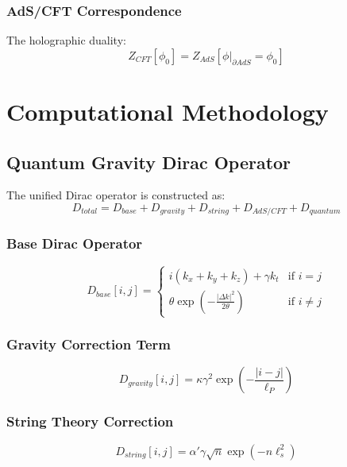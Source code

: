 \documentclass[12pt]{article}
\begin{document}
\subsubsection{AdS/CFT Correspondence}
The holographic duality:
\begin{equation}
Z_{CFT}[\phi_0] = Z_{AdS}[\phi|_{\partial AdS} = \phi_0]
\end{equation}

\section{Computational Methodology}

\subsection{Quantum Gravity Dirac Operator}

The unified Dirac operator is constructed as:
\begin{equation}
D_{total} = D_{base} + D_{gravity} + D_{string} + D_{AdS/CFT} + D_{quantum}
\end{equation}

\subsubsection{Base Dirac Operator}
\begin{equation}
D_{base}[i,j] = \begin{cases}
i(k_x + k_y + k_z) + \gamma k_t & \text{if } i = j \\
\theta \exp\left(-\frac{|\Delta k|^2}{2\theta}\right) & \text{if } i \neq j
\end{cases}
\end{equation}

\subsubsection{Gravity Correction Term}
\begin{equation}
D_{gravity}[i,j] = \kappa \gamma^2 \exp\left(-\frac{|i-j|}{\ell_P}\right)
\end{equation}

\subsubsection{String Theory Correction}
\begin{equation}
D_{string}[i,j] = \alpha' \gamma \sqrt{n} \exp(-n \ell_s^2)
\end{equation}
\end{document}

